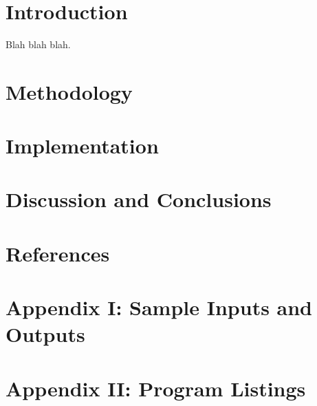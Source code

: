 \documentclass[paper=letter, fontsize=11pt, oneside, titlepage]{scrartcl}
\title{
\vspace{1.8 in} \normalfont \normalsize 
\textsc{\pschool} \\ [25pt] %
\horrule{0.5pt} \\[0.4cm] %
\huge \ptitle \\ %
\horrule{0.5pt} \\[0.5cm] %
}
\author{\pauthor} %
\date{
    \normalsize
    \pteacher \endgraf
    \pclass \endgraf
    \pdate
} %
\newcommand{\datalisting}[2][]{
    
}
\newcommand{\filelisting}[2][]{
    
}
\begin{document}

\maketitle

\section{Introduction}\label{intro}

Blah blah blah.

\section{Methodology}\label{meth}
\section{Implementation}\label{impl}
\section{Discussion and Conclusions}\label{conclusions}
\section{References}\label{ref}
\section{Appendix I: Sample Inputs and Outputs}\label{sample}

\filelisting[language=pascal]{test1_correct.pas}
\filelisting{test1_correct.pas.listing}
\filelisting{test1_correct.pas.tokens}
\filelisting[language=pascal]{test2_errors.pas}
\filelisting{test2_errors.pas.listing}
\filelisting{test2_errors.pas.tokens}

\section{Appendix II: Program Listings}\label{code}

\datalisting{operators.dat}
\datalisting{punctuation.dat}
\datalisting{reservedwords.dat}
\end{document}
